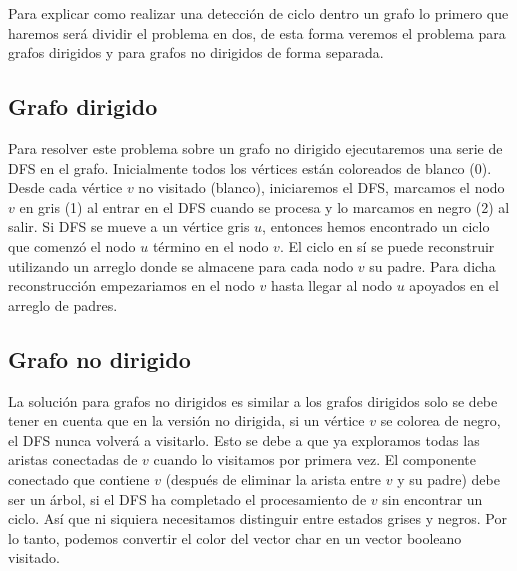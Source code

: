 Para explicar como realizar una detección de ciclo dentro un grafo lo primero que haremos será dividir el problema en dos, de esta forma veremos el problema para grafos dirigidos y para grafos no dirigidos de forma separada.

\subsection{Grafo dirigido}

Para resolver este problema sobre un grafo no dirigido ejecutaremos una serie de DFS en el grafo. Inicialmente todos los vértices están coloreados de blanco (0). Desde cada vértice $v$ no visitado (blanco), iniciaremos el DFS, marcamos el nodo $v$ en gris (1) al entrar en el DFS cuando se procesa  y lo marcamos en negro (2) al salir. Si DFS se mueve a un vértice gris $u$, entonces hemos encontrado un ciclo que comenzó el nodo $u$ término en el nodo $v$. El ciclo en sí se puede reconstruir utilizando un arreglo donde se almacene para cada nodo $v$ su padre. Para dicha reconstrucción empezariamos en el nodo $v$ hasta llegar al nodo $u$ apoyados en el arreglo de padres.



\subsection{Grafo no dirigido}

La solución para grafos no dirigidos es similar a los grafos dirigidos solo se debe tener en cuenta que en la versión no dirigida, si un vértice $v$ se colorea de negro, el DFS nunca volverá a visitarlo. Esto se debe a que ya exploramos todas las aristas conectadas de $v$ cuando lo visitamos por primera vez. El componente conectado que contiene $v$ (después de eliminar la arista entre $v$ y su padre) debe ser un árbol, si el DFS ha completado el procesamiento de $v$ sin encontrar un ciclo. Así que ni siquiera necesitamos distinguir entre estados grises y negros. Por lo tanto, podemos convertir el color del vector char en un vector booleano visitado.


